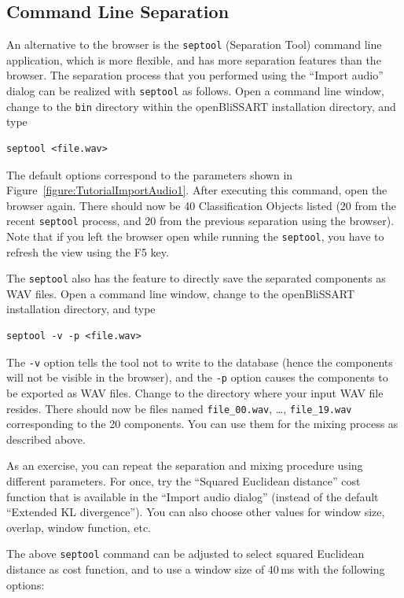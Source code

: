 \subsection{Command Line Separation}

\noindent An alternative to the browser is the {\tt septool} (Separation Tool) command line
application, which is more flexible, and has more separation features than the
browser. The separation process that you performed using the ``Import audio''
dialog can be realized with {\tt septool} as follows. Open a command line window, change to the {\tt bin} directory within the openBliSSART installation directory, and type 

\begin{verbatim}
septool <file.wav>
\end{verbatim}

The default options correspond to the parameters shown in Figure~\ref{figure:TutorialImportAudio1}. After executing this command, open the browser again. There should now be 40 Classification Objects listed (20 from the recent {\tt septool} process, and 20 from the previous separation using the browser). Note that if you left the browser open while running the {\tt septool}, you have to refresh the view using the F5 key.

The {\tt septool} also has the feature to directly save the separated components as WAV files. Open a command line window, change to the openBliSSART installation directory, and type

\begin{verbatim}
septool -v -p <file.wav>
\end{verbatim}

The {\tt -v} option tells the tool not to write to the database (hence the
components will not be visible in the browser), and the {\tt -p} option causes
the components to be exported as WAV files. Change to the directory where your
input WAV file resides. There should now be files named {\tt file\_00.wav},
\dots, {\tt file\_19.wav} corresponding to the 20 components. You can use them
for the mixing process as described above.

As an exercise, you can repeat the separation and mixing procedure using
different parameters. For once, try the ``Squared Euclidean distance'' cost
function that is available in the ``Import audio dialog'' (instead of the
default ``Extended KL divergence''). You can also choose other values for
window size, overlap, window function, etc. 

The above {\tt septool} command can be adjusted to select squared Euclidean
distance as cost function, and to use a window size of 40\,ms with the
following options:

